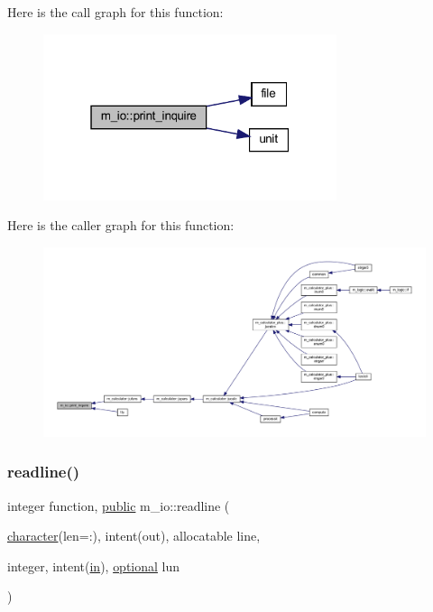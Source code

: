Here is the call graph for this function\+:
\nopagebreak
\begin{figure}[H]
\begin{center}
\leavevmode
\includegraphics[width=244pt]{namespacem__io_aa6ee277b2e0f1c263488624b34371fcf_cgraph}
\end{center}
\end{figure}
Here is the caller graph for this function\+:
\nopagebreak
\begin{figure}[H]
\begin{center}
\leavevmode
\includegraphics[width=350pt]{namespacem__io_aa6ee277b2e0f1c263488624b34371fcf_icgraph}
\end{center}
\end{figure}
\mbox{\label{namespacem__io_a8d9ee59e21830662fa59c300ca23e04b}} 
\subsubsection{\texorpdfstring{readline()}{readline()}}
{\footnotesize\ttfamily integer function, \hyperlink{M__stopwatch_83_8txt_a2f74811300c361e53b430611a7d1769f}{public} m\+\_\+io\+::readline (\begin{DoxyParamCaption}\item[{\hyperlink{option__stopwatch_83_8txt_abd4b21fbbd175834027b5224bfe97e66}{character}(len=\+:), intent(out), allocatable}]{line,  }\item[{integer, intent(\hyperlink{M__journal_83_8txt_afce72651d1eed785a2132bee863b2f38}{in}), \hyperlink{option__stopwatch_83_8txt_aa4ece75e7acf58a4843f70fe18c3ade5}{optional}}]{lun }\end{DoxyParamCaption})}



